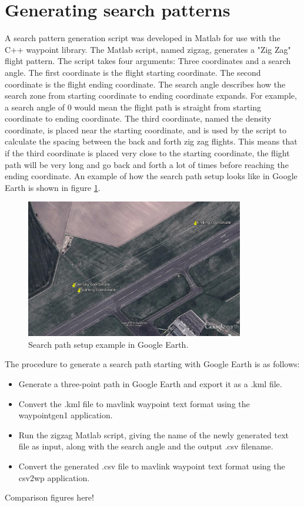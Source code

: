 \section{Generating search patterns}
A search pattern generation script was developed in Matlab for use with the C++ waypoint library.
The Matlab script, named zigzag, generates a "Zig Zag" flight pattern.
The script takes four arguments: Three coordinates and a search angle.
The first coordinate is the flight starting coordinate. The second coordinate is the flight ending
coordinate.
The search angle describes how the search zone from starting coordinate to ending coordinate
expands.
For example, a search angle of 0 would mean the flight path is straight from starting coordinate to
ending coordinate.
The third coordinate, named the density coordinate, is placed near the starting coordinate, and is
used by the script to calculate the spacing
between the back and forth zig zag flights. This means that if the third coordinate is placed very
close to the starting coordinate,
the flight path will be very long and go back and forth a lot of times before reaching the ending
coordinate.
An example of how the search path setup looks like in Google Earth is shown in figure
\ref{fig:googlepath}.
\begin{figure}[ht]
	\centering
	\includegraphics[width=0.85\textwidth]{Images/googlepath}
	\caption[Search path setup.]{Search path setup example in Google Earth.}
	\label{fig:googlepath}
\end{figure}
The procedure to generate a search path starting with Google Earth is as follows:
\begin{itemize}
\item Generate a three-point path in Google Earth and export it as a .kml file.
\item Convert the .kml file to mavlink waypoint text format using the waypointgen1 application.
\item Run the zigzag Matlab script, giving the name of the newly generated text file as input, along
with the search angle and the output .csv filename.
\item Convert the generated .csv file to mavlink waypoint text format using the csv2wp application.
\end{itemize}

Comparison figures here!


\newpage